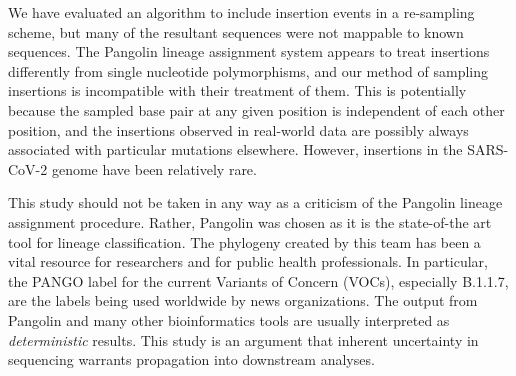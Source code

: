 \documentclass[12pt]{article}
\begin{document}
We have evaluated an algorithm to include insertion events in a re-sampling scheme, but many of the resultant sequences were not mappable to known sequences.
The Pangolin lineage assignment system appears to treat insertions differently from single nucleotide polymorphisms, and our method of sampling insertions is incompatible with their treatment of them.
This is potentially because the sampled base pair at any given position is independent of each other position, and the insertions observed in real-world data are possibly always associated with particular mutations elsewhere.
However, insertions in the SARS-CoV-2 genome have been relatively rare.

This study should not be taken in any way as a criticism of the Pangolin lineage assignment procedure.
Rather, Pangolin was chosen as it is the state-of-the art tool for lineage classification.
The phylogeny created by this team has been a vital resource for researchers and for public health professionals.
In particular, the PANGO label for the current Variants of Concern (VOCs), especially B.1.1.7, are the labels being used worldwide by news organizations.
The output from Pangolin and many other bioinformatics tools are usually interpreted as \emph{deterministic} results.
This study is an argument that inherent uncertainty in sequencing warrants propagation into downstream analyses.

\printbibliography
\end{document}
